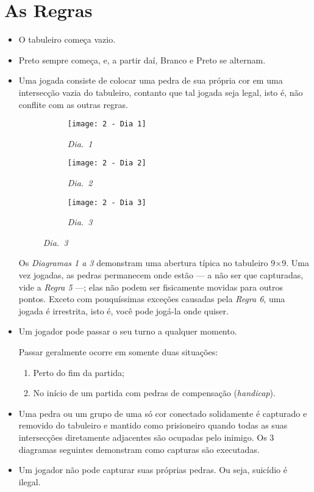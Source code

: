 \chapter{As Regras}\label{chap:regras}

\begin{itemize}
    \item[\textbf{Regra 1}] O tabuleiro começa vazio.
    \item[\textbf{Regra 2}] Preto sempre começa, e, a partir daí, Branco e Preto se alternam. 
    \item[\textbf{Regra 3}] Uma jogada consiste de colocar uma pedra de sua própria cor em uma intersecção vazia do tabuleiro, contanto que tal jogada seja legal, isto é, não conflite com as outras regras.

    \begin{figure}[h]
        \centering
        \begin{subfigure}{.3\textwidth}
            \centering
            \texttt{[image: 2 - Dia 1]}
            \caption*{\emph{Dia.\@~1}}
        \end{subfigure}
        \begin{subfigure}{.3\textwidth}
            \centering
            \texttt{[image: 2 - Dia 2]}
            \caption*{\emph{Dia.\@~2}}
        \end{subfigure}
        \begin{subfigure}{.3\textwidth}
            \centering
            \texttt{[image: 2 - Dia 3]}
            \caption*{\emph{Dia.\@~3}}
        \end{subfigure}
    \end{figure}

    Os \emph{Diagramas 1 a 3} demonstram uma abertura típica no tabuleiro 9\(\times\)9. Uma vez jogadas, as pedras permanecem onde estão --- a não ser que capturadas, vide a \emph{Regra 5} ---; elas não podem ser fisicamente movidas para outros pontos. Exceto com pouquíssimas exceções causadas pela \emph{Regra 6}, uma jogada é irrestrita, isto é, você pode jogá-la onde quiser.

    \item[\textbf{Regra 4}] Um jogador pode passar o seu turno a qualquer momento.
    
    Passar geralmente ocorre em somente duas situações:
        
    \begin{enumerate}
        \item Perto do fim da partida;
        \item No início de um partida com pedras de compensação (\emph{handicap}).
    \end{enumerate}
    \item[\textbf{Regra 5}] Uma pedra ou um grupo de uma só cor conectado solidamente é capturado e removido do tabuleiro e mantido como prisioneiro quando todas as suas intersecções diretamente adjacentes são ocupadas pelo inimigo. Os 3 diagramas seguintes demonstram como capturas são executadas.
    \item[\textbf{Regra 6}] Um jogador não pode capturar suas próprias pedras. Ou seja, suicídio é ilegal.
\end{itemize}

